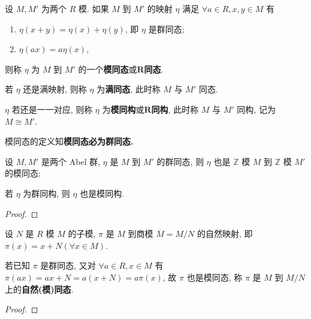 \documentclass[../../main.tex]{subfiles}%
\begin{document}
\begin{definition}
设 \( M, M' \) 为两个 \( R \) 模. 如果 \( M \) 到 \( M' \) 的映射 \( \eta \) 满足 \( \forall a \in R, x, y \in M \) 有
\begin{enumerate}[(1)]
\item \( \eta(x + y) = \eta(x) + \eta(y) \), 即 \( \eta \) 是群同态;
\item \( \eta(ax) = a\eta(x) \),
\end{enumerate}
则称 \( \eta \) 为 \( M \) 到 \( M' \) 的一个\textbf{模同态}或\(\boldsymbol{R}\)\textbf{同态}.

若 \( \eta \) 还是满映射, 则称 \( \eta \) 为\textbf{满同态}, 此时称 \( M \) 与 \( M' \) 同态.

\( \eta \) 若还是一一对应, 则称 \( \eta \) 为\textbf{模同构}或\(\boldsymbol{R}\)\textbf{同构}, 此时称 \( M \) 与 \( M' \) 同构, 记为 \( M \cong M' \).
\end{definition}
\begin{remark}
模同态的定义知\textbf{模同态必为群同态.}
\end{remark}

\begin{proposition}\label{proposition:抽象代数-例题1.6.10}
设 \( M, M' \) 是两个 Abel 群, \( \eta \) 是 \( M \) 到 \( M' \) 的群同态, 则 \( \eta \) 也是 \( \mathbb{Z} \) 模 \( M \) 到 \( \mathbb{Z} \) 模 \( M' \) 的模同态; 

若 \( \eta \) 为群同构, 则 \( \eta \) 也是模同构.
\end{proposition}
\begin{proof}



\end{proof}

\begin{theorem}\label{theorem:自然模同态的良定义}
设 \( N \) 是 \( R \) 模 \( M \) 的子模, \( \pi \) 是 \( M \) 到商模 \( \overline{M} = M/N \) 的自然映射, 即 \( \pi(x) = x + N (\forall x \in M) \). 

若已知 \( \pi \) 是群同态, 又对 \( \forall a \in R, x \in M \) 有 \( \pi(ax) = ax + N = a(x + N) = a\pi(x) \), 故 \( \pi \) 也是模同态, 称 \( \pi \) 是 \( M \) 到 \( M/N \) 上的\textbf{自然(模)同态}.
\end{theorem}
\begin{proof}



\end{proof}
\end{document}
